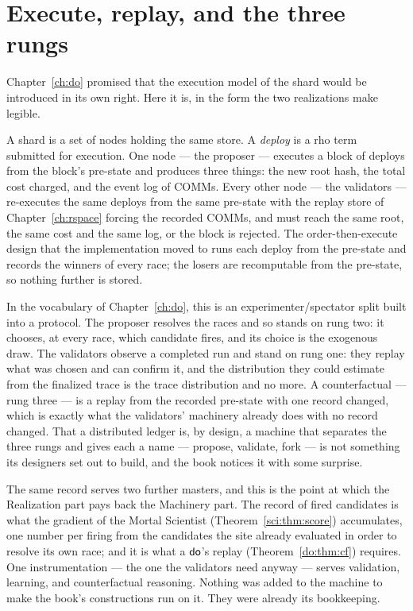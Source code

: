 \section{Execute, replay, and the three rungs}
\label{pr:sec:validators}

Chapter~\ref{ch:do} promised that the execution model of the shard would be introduced in
its own right. Here it is, in the form the two realizations make legible.

A shard is a set of nodes holding the same store. A \emph{deploy} is a rho term submitted
for execution. One node --- the proposer --- executes a block of deploys from the block's
pre-state and produces three things: the new root hash, the total cost charged, and the
event log of COMMs. Every other node --- the validators --- re-executes the same deploys
from the same pre-state with the replay store of Chapter~\ref{ch:rspace} forcing the
recorded COMMs, and must reach the same root, the same cost and the same log, or the block
is rejected. The order-then-execute design that the implementation moved to runs each
deploy from the pre-state and records the winners of every race; the losers are
recomputable from the pre-state, so nothing further is stored.

In the vocabulary of Chapter~\ref{ch:do}, this is an experimenter/spectator split built
into a protocol. The proposer resolves the races and so stands on rung two: it chooses, at
every race, which candidate fires, and its choice is the exogenous draw. The validators
observe a completed run and stand on rung one: they replay what was chosen and can confirm
it, and the distribution they could estimate from the finalized trace is the trace
distribution and no more. A counterfactual --- rung three --- is a replay from the recorded
pre-state with one record changed, which is exactly what the validators' machinery already
does with no record changed. That a distributed ledger is, by design, a machine that
separates the three rungs and gives each a name --- propose, validate, fork --- is not
something its designers set out to build, and the book notices it with some surprise.

The same record serves two further masters, and this is the point at which the Realization
part pays back the Machinery part. The record of fired candidates is what the gradient of
the Mortal Scientist (Theorem~\ref{sci:thm:score}) accumulates, one number per firing from
the candidates the site already evaluated in order to resolve its own race; and it is what
a $\textsf{do}$'s replay (Theorem~\ref{do:thm:cf}) requires. One instrumentation --- the one the
validators need anyway --- serves validation, learning, and counterfactual reasoning.
Nothing was added to the machine to make the book's constructions run on it. They were
already its bookkeeping.

